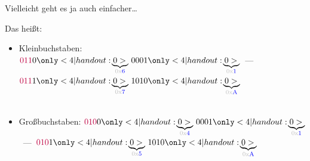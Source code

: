 \addtocounter{exercise}{-1}\addtocounter{solve}{-1}
\begin{frame}[noframenumbering]{Vielleicht geht es ja auch einfacher\dots}
    \begin{exercise}\end{exercise}
    \begin{solve}[Trickserei!]
        Das heißt:\begin{itemize}
            \item<2-> Kleinbuchstaben: \(\textcolor{purple}{011}0\only<4|handout:0>{\mathllap{\underbrace{\hphantom{0110}}_\text{\color{lightgray}0x\color{blue}6}}}~0001\only<4|handout:0>{\mathllap{\underbrace{\hphantom{0001}}_\text{\color{lightgray}0x\color{blue}1}}}\)~---~\(\textcolor{purple}{011}1\only<4|handout:0>{\mathllap{\underbrace{\hphantom{0111}}_\text{\color{lightgray}0x\color{blue}7}}}~1010\only<4|handout:0>{\mathllap{\underbrace{\hphantom{1010}}_\text{\color{lightgray}0x\color{blue}A}}}\)\\
            \hphantom{Kleinbuchstaben: }\\
            \hphantom{Kleinbuchstaben: }
            \item<3-> Großbuchstaben: \(\textcolor{purple}{010}0\only<4|handout:0>{\mathllap{\underbrace{\hphantom{0100}}_\text{\color{lightgray}0x\color{blue}4}}}~0001\only<4|handout:0>{\mathllap{\underbrace{\hphantom{0001}}_\text{\color{lightgray}0x\color{blue}1}}}\)~---~\(\textcolor{purple}{010}1\only<4|handout:0>{\mathllap{\underbrace{\hphantom{0101}}_\text{\color{lightgray}0x\color{blue}5}}}~1010\only<4|handout:0>{\mathllap{\underbrace{\hphantom{1010}}_\text{\color{lightgray}0x\color{blue}A}}}\)\\
            \hphantom{Großbuchstaben: }\\
            \hphantom{Großbuchstaben: }
        \end{itemize}
    \end{solve}
\end{frame}